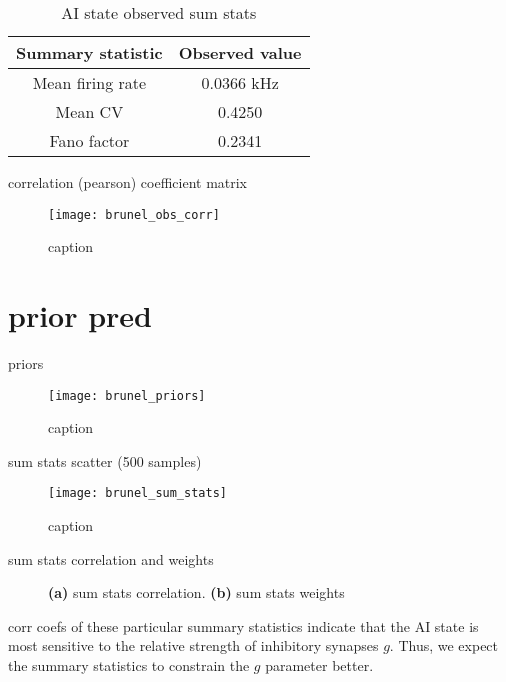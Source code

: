\begin{table}[H]
  \caption{AI state observed sum stats}
  \begin{center}
    \begin{tabular}{cc}
      \toprule
      \textbf{Summary statistic} & \textbf{Observed value} \\
      \midrule
      Mean firing rate &  0.0366 kHz \\
      Mean CV &  0.4250  \\
      Fano factor & 0.2341  \\
      \bottomrule
    \end{tabular}
  \end{center}
  \label{tab:hh_noisy_sumstats}
\end{table}

correlation (pearson) coefficient matrix

\begin{figure}[H]
    \centering
    \texttt{[image: brunel\_obs\_corr]}
    \caption{caption}
    \label{fig:fig1}
\end{figure}

\section{prior pred}

priors

\begin{figure}[H]
    \centering
    \texttt{[image: brunel\_priors]}
    \caption{caption}
    \label{fig:fig1}
\end{figure}

sum stats scatter (500 samples)

\begin{figure}[H]
    \centering
    \texttt{[image: brunel\_sum\_stats]}
    \caption{caption}
    \label{fig:fig1}
\end{figure}


sum stats correlation and weights

\begin{figure}[H]
\centering
{}
\qquad
{}
\caption{\textbf{(a)} sum stats correlation. \textbf{(b)} sum stats weights
}
\label{fig:fig1}
\end{figure}

corr coefs of these particular summary statistics indicate that the AI state is most sensitive to the relative strength of inhibitory synapses $g$. Thus, we expect the summary statistics to constrain the $g$ parameter better.


